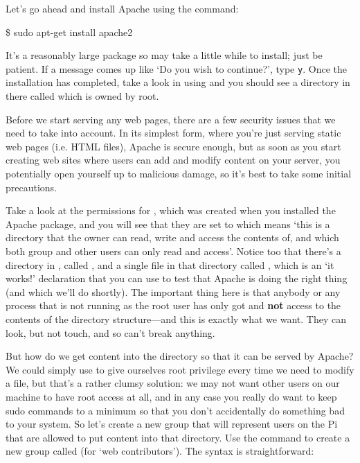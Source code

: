 Let's go ahead and install Apache using the command:

\begin{ttoutenv}
\$ sudo apt-get install apache2
\end{ttoutenv}

It's a reasonably large package so may take a little while to install;
just be patient. If a message comes up like `Do you wish to
continue?', type \verb+y+. Once the installation has completed, take a
look in  using  and you should see a
directory in there called  which is owned by root.

Before we start serving any web pages, there are a few security issues
that we need to take into account. In its simplest form, where you're
just serving static web pages (i.e. HTML files), Apache is secure
enough, but as soon as you start creating web sites where users can
add and modify content on your server, you potentially open yourself
up to malicious damage, so it's best to take some initial precautions.

Take a look at the permissions for , which was created
when you installed the Apache package, and you will see that they are
set to  which means `this is a directory that the
owner can read, write and access the contents of, and which both group
and other users can only read and access'. Notice too that there's
a directory in , called , and a
single file in that directory called , which is an
`it works!' declaration that you can use to test that Apache is doing
the right thing (and which we'll do shortly). The important thing here
is that anybody or any process that is not running as the root user
has only got  and \textbf{not}  access to
the contents of the  directory structure---and this is
exactly what we want. They can look, but not touch, and so can't break
anything.

But how do we get content into the  directory so that
it can be served by Apache? We could simply use  to give
ourselves root privilege every time we need to modify a file, but
that's a rather clumsy solution: we may not want other users on our
machine to have root access at all, and in any case you really do want
to keep sudo commands to a minimum so that you don't accidentally do
something bad to your system. So let's create a new group that will
represent users on the Pi that are allowed to put content into that
directory. Use the command  to create a new
group called  (for `web contributors'). The syntax
is straightforward:

